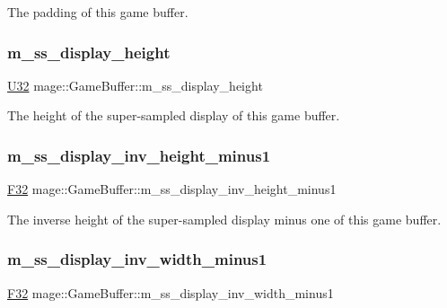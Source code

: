 The padding of this game buffer. \hypertarget{structmage_1_1_game_buffer_a95b2766f3320627910ec153b512e5695}{}\label{structmage_1_1_game_buffer_a95b2766f3320627910ec153b512e5695} 
\subsubsection{\texorpdfstring{m\+\_\+ss\+\_\+display\+\_\+height}{m\_ss\_display\_height}}
{\footnotesize\ttfamily \hyperlink{namespacemage_a41c104c036fba3756a74e19f793eeaa1}{U32} mage\+::\+Game\+Buffer\+::m\+\_\+ss\+\_\+display\+\_\+height}

The height of the super-\/sampled display of this game buffer. \hypertarget{structmage_1_1_game_buffer_a28079651a44977c137e07c88de9caabc}{}\label{structmage_1_1_game_buffer_a28079651a44977c137e07c88de9caabc} 
\subsubsection{\texorpdfstring{m\+\_\+ss\+\_\+display\+\_\+inv\+\_\+height\+\_\+minus1}{m\_ss\_display\_inv\_height\_minus1}}
{\footnotesize\ttfamily \hyperlink{namespacemage_aa97e833b45f06d60a0a9c4fc22ae02c0}{F32} mage\+::\+Game\+Buffer\+::m\+\_\+ss\+\_\+display\+\_\+inv\+\_\+height\+\_\+minus1}

The inverse height of the super-\/sampled display minus one of this game buffer. \hypertarget{structmage_1_1_game_buffer_ad2d605152c5c5a3e0059e65fd6814238}{}\label{structmage_1_1_game_buffer_ad2d605152c5c5a3e0059e65fd6814238} 
\subsubsection{\texorpdfstring{m\+\_\+ss\+\_\+display\+\_\+inv\+\_\+width\+\_\+minus1}{m\_ss\_display\_inv\_width\_minus1}}
{\footnotesize\ttfamily \hyperlink{namespacemage_aa97e833b45f06d60a0a9c4fc22ae02c0}{F32} mage\+::\+Game\+Buffer\+::m\+\_\+ss\+\_\+display\+\_\+inv\+\_\+width\+\_\+minus1}

